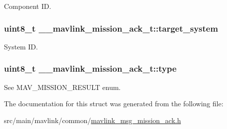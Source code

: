 Component I\+D. 

\hypertarget{struct____mavlink__mission__ack__t_ab8ef2eb9bff8975de92406b94c18d907}{
\subsubsection[{target\+\_\+system}]{\setlength{\rightskip}{0pt plus 5cm}uint8\+\_\+t \+\_\+\+\_\+mavlink\+\_\+mission\+\_\+ack\+\_\+t\+::target\+\_\+system}}\label{struct____mavlink__mission__ack__t_ab8ef2eb9bff8975de92406b94c18d907}


System I\+D. 

\hypertarget{struct____mavlink__mission__ack__t_ad05f998d3b1bea0480eb25dcb82e0c92}{
\subsubsection[{type}]{\setlength{\rightskip}{0pt plus 5cm}uint8\+\_\+t \+\_\+\+\_\+mavlink\+\_\+mission\+\_\+ack\+\_\+t\+::type}}\label{struct____mavlink__mission__ack__t_ad05f998d3b1bea0480eb25dcb82e0c92}


See M\+A\+V\+\_\+\+M\+I\+S\+S\+I\+O\+N\+\_\+\+R\+E\+S\+U\+L\+T enum. 



The documentation for this struct was generated from the following file\+:\begin{DoxyCompactItemize}
\item 
src/main/mavlink/common/\hyperlink{mavlink__msg__mission__ack_8h}{mavlink\+\_\+msg\+\_\+mission\+\_\+ack.\+h}\end{DoxyCompactItemize}

